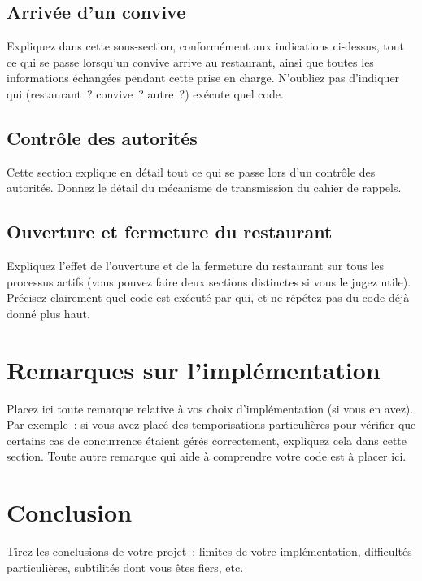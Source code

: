 \documentclass[a4paper]{article}
\makeatletter
\newenvironment{expl}{%
  \begin{list}{}{%
      \small\itshape%
      \topsep\z@%
      \listparindent0pt%
      \parsep0.75\baselineskip%
      \setlength{\leftmargin}{20mm}%
      \setlength{\rightmargin}{20mm}%
    }
  \item[]}%
  {\end{list}}
\makeatother
\begin{document}
\subsection{Arrivée d'un convive}

\begin{expl}
  Expliquez dans cette sous-section, conformément aux indications
  ci-dessus, tout ce qui se passe lorsqu'un convive arrive au
  restaurant, ainsi que toutes les informations échangées pendant
  cette prise en charge. N'oubliez pas d'indiquer qui (restaurant~?
  convive~? autre~?) exécute quel code.
\end{expl}

\subsection{Contrôle des autorités}

\begin{expl}
  Cette section explique en détail tout ce qui se passe lors d'un
  contrôle des autorités. Donnez le détail du mécanisme de
  transmission du cahier de rappels.
\end{expl}

\subsection{Ouverture et fermeture du restaurant}

\begin{expl}
  Expliquez l'effet de l'ouverture et de la fermeture du restaurant
  sur tous les processus actifs (vous pouvez faire deux sections
  distinctes si vous le jugez utile). Précisez clairement quel code
  est exécuté par qui, et ne répétez pas du code déjà donné plus haut.
\end{expl}

\section{Remarques sur l'implémentation}

\begin{expl}
  Placez ici toute remarque relative à vos choix d'implémentation (si
  vous en avez). Par exemple~: si vous avez placé des temporisations
  particulières pour vérifier que certains cas de concurrence étaient
  gérés correctement, expliquez cela dans cette section. Toute autre
  remarque qui aide à comprendre votre code est à placer ici.
\end{expl}

\section{Conclusion}

\begin{expl}
  Tirez les conclusions de votre projet~: limites de votre
  implémentation, difficultés particulières, subtilités dont vous êtes
  fiers, etc.
\end{expl}
\end{document}
